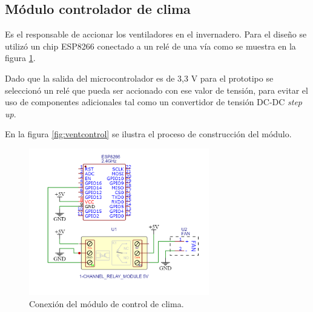 \subsection{Módulo controlador de clima}
\label{Módulo controlador de clima}

Es el responsable de accionar los ventiladores en el invernadero. Para el diseño se utilizó un chip ESP8266 conectado a un relé de una vía como se muestra en la figura \ref{fig:ventschem}. 

Dado que la salida del microcontrolador es de 3,3 V para el prototipo se seleccionó un relé que pueda ser accionado con ese valor de tensión, para evitar el uso de componentes adicionales tal como un convertidor de tensión DC-DC \textit{step up}. 

En la figura \ref{fig:ventcontrol} se ilustra el proceso de construcción del módulo. 



\begin{figure}[!h]
	\centering
	\includegraphics[width=0.7\textwidth]{./Figures/vent_schem.png}
	\caption[Conexión del módulo de control de clima]{Conexión del módulo de control de clima.}
	\label{fig:ventschem}
\end{figure}


